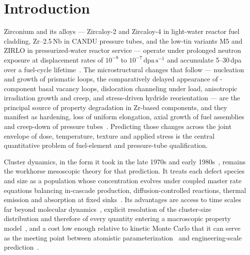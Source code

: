 \section{Introduction}\label{sec:intro}

Zirconium and its alloys --- Zircaloy-2 and Zircaloy-4 in light-water reactor
fuel cladding, Zr--2.5\,Nb in CANDU pressure tubes, and the low-tin variants M5
and ZIRLO in pressurized-water reactor service --- operate under prolonged
neutron exposure at displacement rates of $10^{-8}$ to
$10^{-7}\,\mathrm{dpa\,s^{-1}}$ and accumulate 5--30\,dpa over a fuel-cycle
lifetime~\citep{Adamson2019,LemaignanMotta1994}. The microstructural changes
that follow --- nucleation and growth of \aloop{} prismatic loops, the
comparatively delayed appearance of \cloop{}-component basal vacancy loops,
dislocation channeling under load, anisotropic irradiation growth and creep, and
stress-driven hydride reorientation --- are the principal source of property
degradation in Zr-based components, and they manifest as hardening, loss of
uniform elongation, axial growth of fuel assemblies and creep-down of pressure
tubes~\citep{Northwood1977,Griffiths1988,OnimusBechade2012,Cinbiz2016}.
Predicting those changes across the joint envelope of dose, temperature, texture
and applied stress is the central quantitative problem of fuel-element and
pressure-tube qualification.

Cluster dynamics, in the form it took in the late 1970s and early
1980s~\citep{Kiritani1973,Hayns1976,Ghoniem1977,Ghoniem1979a,Ghoniem1980}, remains
the workhorse mesoscopic theory for that prediction. It treats each defect
species and size as a population whose concentration evolves under coupled master
rate equations balancing in-cascade production, diffusion-controlled reactions,
thermal emission and absorption at fixed
sinks~\citep{BrailsfordBullough1972,Wiedersich1972,Mansur1978}. Its advantages
are access to time scales far beyond molecular
dynamics~\citep{Bacon2009,Marian2017}, explicit resolution of the cluster-size
distribution and therefore of every quantity entering a macroscopic property
model~\citep{GolubovSingh2001,Holt1988}, and a cost low enough relative to
kinetic Monte Carlo that it can serve as the meeting point between atomistic
parameterization~\citep{Christensen2015,PatraTrinkle2019} and engineering-scale
prediction~\citep{KohnertWirth2017,OnimusBechade2012}.

